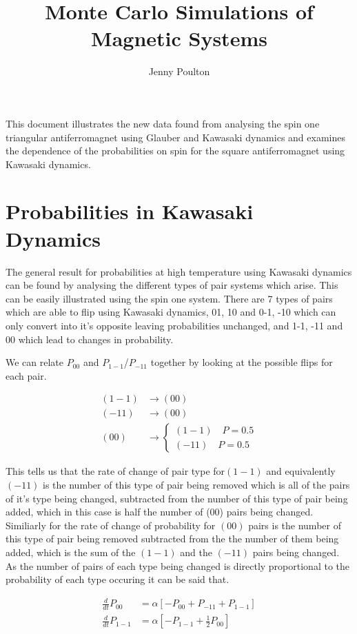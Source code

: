 \documentclass[]{article}
\title{Monte Carlo Simulations of Magnetic Systems}
\author{Jenny Poulton}
\begin{document}
\maketitle

This document illustrates the new data found from analysing the spin one triangular antiferromagnet using Glauber and Kawasaki dynamics and examines the dependence of the probabilities on spin for the square antiferromagnet using Kawasaki dynamics.

\section{Probabilities in Kawasaki Dynamics}

The general result for probabilities at high temperature using Kawasaki dynamics can be found by analysing the different types of pair systems which arise. This can be easily illustrated using the spin one system. There are 7 types of pairs which are able to flip using Kawasaki dynamics, 01, 10 and 0-1, -10 which can only convert into it's opposite leaving probabilities unchanged, and 1-1, -11 and 00 which lead to changes in probability.

We can relate $P_{00}$ and $P_{1-1}$/$P_{-11}$ together by looking at the possible flips for each pair.

\begin{align}
(1-1)& \rightarrow (00)\\
(-11)& \rightarrow (00)\\
(00)&\rightarrow
\begin{cases}
(1-1) \quad P=0.5\\
(-11) \quad P=0.5
\end{cases}
\end{align}

This tells us that the rate of change of pair type for$(1-1)$ and equivalently$(-11)$ is the number of this type of pair being removed which is all of the pairs of it's type being changed, subtracted from the number of this type of pair being added, which in this case is half the number of (00) pairs being changed. Similiarly for the rate of change of probability for $(00)$ pairs is the number of this type of pair being removed subtracted from the the number of them being added, which is the sum of the $(1-1)$ and the $(-11)$ pairs being changed. As the number of pairs of each type being changed is directly proportional to the probability of each type occuring it can be said that.

\begin{align}
\frac{d}{dt} P_{00} &= \alpha[-P_{00} + P_{-11} + P_{1-1}]\\
\frac{d}{dt} P_{1-1} &= \alpha[-P_{1-1} +\frac{1}{2}P_{00}]
\end{align}
\end{document}
